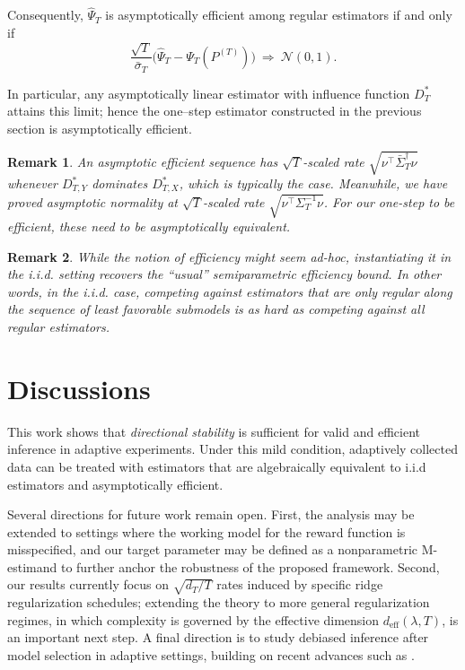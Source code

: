 \documentclass[11pt]{article}
\newtheorem{rem}{Remark}
\begin{document}
Consequently, $\widehat\Psi_T$ is asymptotically efficient among
regular estimators if and only if
\begin{equation}
\frac{\sqrt{T}}{\bar\sigma_T}
\big(\widehat\Psi_T-\Psi_T(P^{(T)})\big)
\ \Rightarrow\ \mathcal N(0,1).
\end{equation}

In particular, any asymptotically linear estimator with influence function
$D_T^*$ attains this limit; hence the one--step estimator constructed in the previous section is asymptotically efficient.




\begin{rem}
    An asymptotic efficient sequence has $\sqrt{T}$-scaled rate $\sqrt{\nu^\top \bar \Sigma_T^{\dag} \nu}$ whenever $D_{T,Y}^*$ dominates $D_{T,X}^*$, which is typically the case. Meanwhile, we have proved asymptotic normality at $\sqrt{T}$-scaled rate $\sqrt{\nu^\top \Sigma_T^{-1} \nu}$. For our one-step to be efficient, these need to be asymptotically equivalent.
\end{rem}

\begin{rem}
    While the notion of efficiency might seem ad-hoc, instantiating it in the i.i.d. setting recovers the ``usual'' semiparametric efficiency bound. In other words, in the i.i.d. case, competing against estimators that are only regular along the sequence of least favorable submodels is as hard as competing against all regular estimators.
\end{rem}




\section{Discussions}

This work shows that \emph{directional stability} is sufficient for valid and
efficient inference in adaptive experiments. Under this mild condition, adaptively collected data can be treated with estimators that are algebraically equivalent to i.i.d estimators and asymptotically efficient.

Several directions for future work remain open. First,  the analysis may be extended to settings where the working model for the reward function is misspecified, and  our target parameter may be defined as a nonparametric M-estimand to further anchor the robustness of the proposed framework. Second, our results
currently focus on $\sqrt{d_T/T}$ rates induced by specific ridge regularization
schedules; extending the theory to more general regularization regimes, in
which complexity is governed by the effective dimension
$d_{\mathrm{eff}}(\lambda,T)$, is an important next step. A final direction is to study debiased inference after model selection in adaptive settings,
building on recent advances such as
\citet{vanderlaan2023adaptivedebiasedmachinelearning}.
\end{document}
